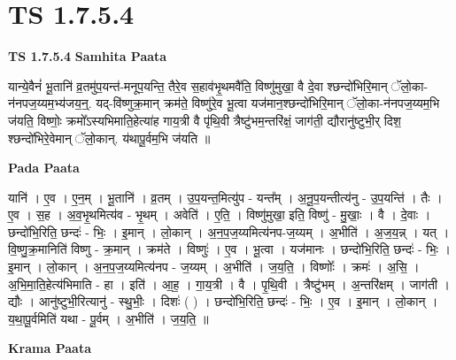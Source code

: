 \documentclass[17pt]{extarticle}
\begin{document}
\section*{ TS 1.7.5.4 }

\textbf{TS 1.7.5.4 } \newline
\textbf{Samhita Paata} \newline

यान्ये॒वैनं॑ भू॒तानि॑ व्र॒तमु॑प॒यन्त॑-मनूप॒यन्ति॒ तैरे॒व स॒हाव॑भृ॒थमवै॑ति॒ विष्णु॑मुखा॒ वै दे॒वा श्छन्दो॑भिरि॒मान् ॅलो॒का-न॑नपज॒य्यम॒भ्य॑जय॒न्॒. यद्-वि॑ष्णुक्र॒मान् क्रम॑ते॒ विष्णु॑रे॒व भू॒त्वा यज॑मान॒श्छन्दो॑भिरि॒मान् ॅलो॒का-न॑नपज॒य्यम॒भि ज॑यति॒ विष्णोः॒ क्रमो᳚ऽस्यभिमाति॒हेत्या॑ह गाय॒त्री वै पृ॑थि॒वी त्रैष्टु॑भम॒न्तरि॑क्षं॒ जाग॑ती॒ द्यौरानु॑ष्टुभी॒र् दिश॒ श्छन्दो॑भिरे॒वेमान् ॅलो॒कान्. य॑थापू॒र्वम॒भि ज॑यति ॥ \newline

\textbf{Pada Paata} \newline

यानि॑ । ए॒व । ए॒न॒म् । भू॒तानि॑ । व्र॒तम् । उ॒प॒यन्त॒मित्यु॑प - यन्त᳚म् । अ॒नू॒प॒यन्तीत्य॑नु - उ॒प॒यन्ति॑ । तैः । ए॒व । स॒ह । अ॒व॒भृ॒थमित्य॑व - भृ॒थम् । अवेति॑ । ए॒ति॒ । विष्णु॑मुखा॒ इति॒ विष्णु॑ - मु॒खाः॒ । वै । दे॒वाः । छन्दो॑भि॒रिति॒ छन्दः॑ - भिः॒ । इ॒मान् । लो॒कान् । अ॒न॒प॒ज॒य्यमित्य॑नप-ज॒य्यम् । अ॒भीति॑ । अ॒ज॒य॒न्न् । यत् । वि॒ष्णु॒क्र॒मानिति॑ विष्णु - क्र॒मान् । क्रम॑ते । विष्णुः॑ । ए॒व । भू॒त्वा । यज॑मानः । छन्दो॑भि॒रिति॒ छन्दः॑ - भिः॒ । इ॒मान् । लो॒कान् । अ॒न॒प॒ज॒य्यमित्य॑नप - ज॒य्यम् । अ॒भीति॑ । ज॒य॒ति॒ । विष्णोः᳚ । क्रमः॑ । अ॒सि॒ । अ॒भि॒मा॒ति॒हेत्य॑भिमाति - हा । इति॑ । आ॒ह॒ । गा॒य॒त्री । वै । पृ॒थि॒वी । त्रैष्टु॑भम् । अ॒न्तरि॑क्षम् । जाग॑ती । द्यौः । आनु॑ष्टुभी॒रित्यानु॑ - स्थु॒भीः॒ । दिशः॑ ( ) । छन्दो॑भि॒रिति॒ छन्दः॑ - भिः॒ । ए॒व । इ॒मान् । लो॒कान् । य॒था॒पू॒र्वमिति॑ यथा - पू॒र्वम् । अ॒भीति॑ । ज॒य॒ति॒ ॥  \newline


\textbf{Krama Paata} \newline
\end{document}
